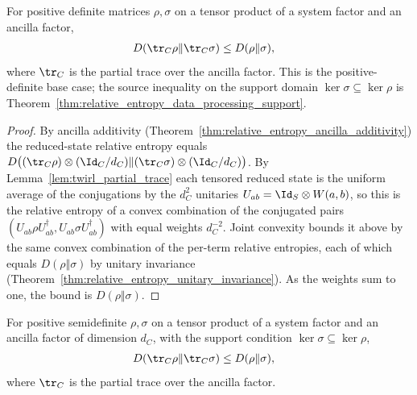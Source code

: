 \begin{theorem}
    \label{thm:relative_entropy_data_processing}
    \leanok
    For positive definite matrices $\rho,\sigma$ on a tensor product of a system
    factor and an ancilla factor,
    \begin{align}
        D(\tr_C\rho\Vert\tr_C\sigma)
         & \le D(\rho\Vert\sigma),
        \label{eq:entropy_data_processing}
    \end{align}
    where $\tr_C$ is the partial trace over the ancilla factor. This is the
    positive-definite base case; the source inequality on the support domain
    $\ker\sigma\subseteq\ker\rho$ is
    Theorem~\ref{thm:relative_entropy_data_processing_support}.
\end{theorem}

\begin{proof}\leanok
    By ancilla additivity (Theorem~\ref{thm:relative_entropy_ancilla_additivity})
    the reduced-state relative entropy equals
    $D\bigl((\tr_C\rho)\otimes(\Id_C/d_C)\Vert
        (\tr_C\sigma)\otimes(\Id_C/d_C)\bigr)$. By
    Lemma~\ref{lem:twirl_partial_trace} each tensored reduced state is the uniform
    average of the conjugations by the $d_C^2$ unitaries
    $U_{ab}=\Id_S\otimes W(a,b)$, so this is the relative entropy of a
    convex combination of the conjugated pairs
    $(U_{ab}\rho U_{ab}^\dagger,U_{ab}\sigma U_{ab}^\dagger)$ with equal
    weights $d_C^{-2}$. Joint convexity bounds it above by the same convex
    combination of the per-term relative entropies, each of which equals
    $D(\rho\Vert\sigma)$ by unitary invariance
    (Theorem~\ref{thm:relative_entropy_unitary_invariance}). As the weights sum to
    one, the bound is $D(\rho\Vert\sigma)$.
\end{proof}

\begin{theorem}
    \label{thm:relative_entropy_data_processing_support}
    \leanok
    For positive semidefinite $\rho,\sigma$ on a tensor product of a system factor
    and an ancilla factor of dimension $d_C$, with the support condition
    $\ker\sigma\subseteq\ker\rho$,
    \begin{align}
        D(\tr_C\rho\Vert\tr_C\sigma)
         & \le D(\rho\Vert\sigma),
        \label{eq:entropy_data_processing_support}
    \end{align}
    where $\tr_C$ is the partial trace over the ancilla factor.
\end{theorem}

